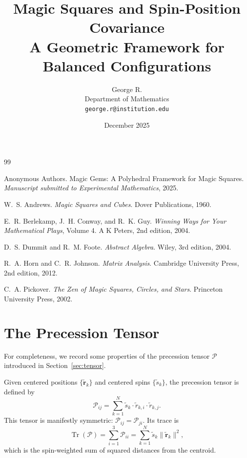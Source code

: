 \documentclass[11pt]{article}
\title{\textbf{Magic Squares and Spin-Position Covariance}\\[0.5em]
\large A Geometric Framework for Balanced Configurations}
\author{George R.\\
Department of Mathematics\\
\texttt{george.r@institution.edu}}
\date{December 2025}
\begin{document}
\maketitle









\begin{thebibliography}{99}

Anonymous Authors.
\newblock Magic Gems: A Polyhedral Framework for Magic Squares.
\newblock \emph{Manuscript submitted to Experimental Mathematics}, 2025.

W.~S. Andrews.
\newblock \emph{Magic Squares and Cubes}.
\newblock Dover Publications, 1960.

E.~R. Berlekamp, J.~H. Conway, and R.~K. Guy.
\newblock \emph{Winning Ways for Your Mathematical Plays}, Volume 4.
\newblock A K Peters, 2nd edition, 2004.

D.~S. Dummit and R.~M. Foote.
\newblock \emph{Abstract Algebra}.
\newblock Wiley, 3rd edition, 2004.

R.~A. Horn and C.~R. Johnson.
\newblock \emph{Matrix Analysis}.
\newblock Cambridge University Press, 2nd edition, 2012.

C.~A. Pickover.
\newblock \emph{The Zen of Magic Squares, Circles, and Stars}.
\newblock Princeton University Press, 2002.

\end{thebibliography}

\appendix

\section{The Precession Tensor}
\label{app:tensor}

For completeness, we record some properties of the precession tensor $\mathcal{P}$ introduced in Section~\ref{sec:tensor}.

Given centered positions $\{\tilde{\mathbf{r}}_k\}$ and centered spins $\{\tilde{s}_k\}$, the precession tensor is defined by
\[
\mathcal{P}_{ij} = \sum_{k=1}^N \tilde{s}_k \cdot \tilde{r}_{k,i} \cdot \tilde{r}_{k,j}.
\]
This tensor is manifestly symmetric: $\mathcal{P}_{ij} = \mathcal{P}_{ji}$. Its trace is
\[
\operatorname{Tr}(\mathcal{P}) = \sum_{i=1}^3 \mathcal{P}_{ii} = \sum_{k=1}^N \tilde{s}_k \|\tilde{\mathbf{r}}_k\|^2,
\]
which is the spin-weighted sum of squared distances from the centroid.
\end{document}
